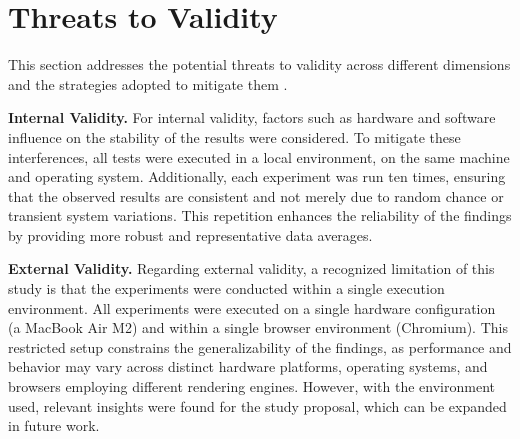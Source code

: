 \section{Threats to Validity}
\label{sec:threats_to_validity}

This section addresses the potential threats to validity across different dimensions and the strategies adopted to mitigate them \cite{book:wohlin}.

\textbf{Internal Validity.}
For internal validity, factors such as hardware and software influence on the stability of the results were considered. To mitigate these interferences, all tests were executed in a local environment, on the same machine and operating system. Additionally, each experiment was run ten times, ensuring that the observed results are consistent and not merely due to random chance or transient system variations. This repetition enhances the reliability of the findings by providing more robust and representative data averages.


\textbf{External Validity.}
Regarding external validity, a recognized limitation of this study is that the experiments were conducted within a single execution environment. All experiments were executed on a single hardware configuration (a MacBook Air M2) and within a single browser environment (Chromium). This restricted setup constrains the generalizability of the findings, as performance and behavior may vary across distinct hardware platforms, operating systems, and browsers employing different rendering engines. However, with the environment used, relevant insights were found for the study proposal, which can be expanded in future work.

